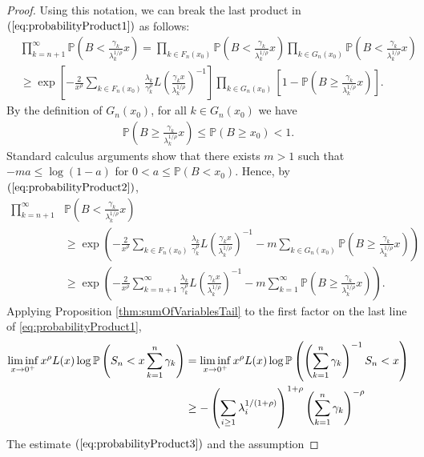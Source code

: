 \documentclass[bj]{imsart}
\numberwithin{equation}{section}
\renewcommand{\P}{\mathbb{P}}
\newcommand{\1}{\mathbf{1}}
\theoremstyle{definition}
\begin{document}
\begin{proof}
Using this notation, we can break the last product in $(\ref{eq:probabilityProduct1})$ as follows:
\begin{align}
&\nonumber \prod_{k=n+1}^{\infty}\P\left(B<\frac{\gamma_{k}}{\lambda_{k}^{1/\rho}}x\right) = \prod_{k\in F_n(x_0)}\P\left(B<\frac{\gamma_{k}}{\lambda_{k}^{1/\rho}}x\right)\prod_{k\in G_n(x_0)}\P\left(B<\frac{\gamma_{k}}{\lambda_{k}^{1/\rho}}x\right)\\
\label{eq:probabilityProduct2}&\geq \exp\left[-\frac{2}{x^\rho}\sum_{k\in F_n(x_0)}\frac{\lambda_k}{\gamma_k^\rho}L\left(\frac{\gamma_kx}{\lambda_k^{1/\rho}}\right)^{-1}\right]\prod_{k\in G_n(x_0)}\left[1-\P\left(B\geq\frac{\gamma_{k}}{\lambda_{k}^{1/\rho}}x\right)\right].
\end{align}
By the definition of $G_n(x_0)$, for all $k\in G_n(x_0)$ we have 
\begin{align*}
\P\left(B\geq\frac{\gamma_{k}}{\lambda_{k}^{1/\rho}}x\right)\leq \P(B\geq x_0)<1.
\end{align*}
Standard calculus arguments show that there exists $m>1$ such that 
$-ma\leq \log(1-a)$ for $0<a\leq\P(B<x_0)$. Hence, by $(\ref{eq:probabilityProduct2})$,
\begin{align}
\nonumber \prod_{k=n+1}^{\infty}&\P\left(B<\frac{\gamma_{k}}{\lambda_{k}^{1/\rho}}x\right) \\
 &\geq \exp\left(-\frac{2}{x^\rho}\sum_{k\in F_n(x_0)}\frac{\lambda_k}{\gamma_k^\rho}L\left(\frac{\gamma_kx}{\lambda_k^{1/\rho}}\right)^{-1}-m\sum_{k\in G_n(x_0)}\P\left(B\geq\frac{\gamma_{k}}{\lambda_{k}^{1/\rho}}x\right)\right)\nonumber\\
&\geq \exp\left(-\frac{2}{x^\rho}\sum_{k=n+1}^\infty\frac{\lambda_k}{\gamma_k^\rho}L\left(\frac{\gamma_kx}{\lambda_k^{1/\rho}}\right)^{-1}-m\sum_{k=1}^\infty\P\left(B\geq\frac{\gamma_{k}}{\lambda_{k}^{1/\rho}}x\right)\right).\label{eq:probabilityProduct3}
\end{align}
Applying Proposition \ref{thm:sumOfVariablesTail} to  the first factor on the last line of \eqref{eq:probabilityProduct1}, 
\begin{align}\notag
\liminf_{x\to 0^+}  x^\rho L(x) \log\P\left(S_n<x\sum_{k=1}^n\gamma_k\right) 
& =\liminf_{x\to 0^+}x^\rho L(x) \log \P\left(\left(\sum_{k=1}^n\gamma_k\right)^{-1}S_n<x\right) \\
 &\geq -
\left(\sum_{i\geq 1}\lambda_i^{1/(1+\rho)}\right)^{1+\rho} \left(\sum_{k=1}^n\gamma_k\right)^{-\rho}\label{o25.1}
\end{align} 
The estimate  $(\ref{eq:probabilityProduct3})$ and the assumption

\end{proof}
\end{document}
